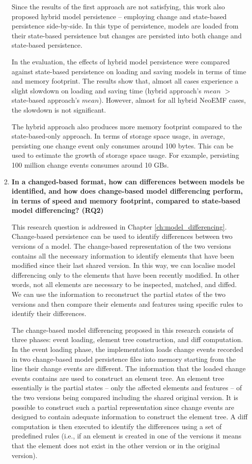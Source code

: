 \begin{enumerate}
  Since the results of the first approach are not satisfying, this work also proposed hybrid model persistence -- employing change and state-based persistence side-by-side. In this type of persistence, models are loaded from their state-based persistence but changes are persisted into both change and state-based persistence.  
  
  In the evaluation, the effects of hybrid model persistence were compared against state-based persistence on loading and saving models in terms of time and memory footprint. The results show that, almost all cases experience a slight slowdown on loading and saving time (hybrid approach's $mean$ $>$ state-based approach's $mean$). However, almost for all hybrid NeoEMF cases, the slowdown is not significant. 
  
  The hybrid approach also produces more memory footprint compared to the state-based-only approach. In terms of storage space usage, in average, persisting one change event only consumes around 100 bytes. This can be used to estimate the growth of storage space usage. For example, persisting 100 million change events consumes around 10 GBs.  
  
  \item \textbf{In a changed-based format, how can differences between models be identified, and how does change-based model differencing perform, in terms of speed and memory footprint, compared to state-based model differencing? (RQ2)}
  
 This research question is addressed in Chapter \ref{ch:model_differencing}.  Change-based persistence can be used to identify differences between two versions of a model. The change-based representation of the two versions contains all the necessary information to identify elements that have been modified since their last shared version. In this way, we can localise model differencing only to the elements that have been recently modified. In other words, not all elements are necessary to be inspected, matched, and diffed. We can use the information to reconstruct the partial states of the two versions and then compare their elements and features using specific rules to identify their differences.  
 
 The change-based model differencing proposed in this research consists of three phases: event loading, element tree construction, and diff computation. In the event loading phase, the implementation loads change events recorded in two change-based model persistence files into memory starting from the line their change events are different. The information that the loaded change events contains are used to construct an element tree. An element tree essentially is the partial states -- only the affected elements and features -- of the two versions being compared including the shared original version. It is possible to construct such a partial representation since change events are designed to contain adequate information to construct the element tree. A diff computation is then executed to identify the differences using a set of predefined rules (i.e., if an element is created in one of the versions it means that the element does not exist in the other version or in the original version).
 

\end{enumerate}
